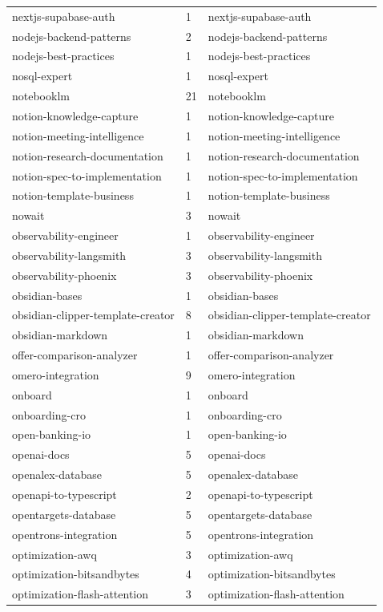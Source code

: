 \begin{longtable}{@{}lll@{}}
nextjs-supabase-auth & 1 & nextjs-supabase-auth\\
nodejs-backend-patterns & 2 & nodejs-backend-patterns\\
nodejs-best-practices & 1 & nodejs-best-practices\\
nosql-expert & 1 & nosql-expert\\
notebooklm & 21 & notebooklm\\
notion-knowledge-capture & 1 & notion-knowledge-capture\\
notion-meeting-intelligence & 1 & notion-meeting-intelligence\\
notion-research-documentation & 1 & notion-research-documentation\\
notion-spec-to-implementation & 1 & notion-spec-to-implementation\\
notion-template-business & 1 & notion-template-business\\
nowait & 3 & nowait\\
observability-engineer & 1 & observability-engineer\\
observability-langsmith & 3 & observability-langsmith\\
observability-phoenix & 3 & observability-phoenix\\
obsidian-bases & 1 & obsidian-bases\\
obsidian-clipper-template-creator & 8 & obsidian-clipper-template-creator\\
obsidian-markdown & 1 & obsidian-markdown\\
offer-comparison-analyzer & 1 & offer-comparison-analyzer\\
omero-integration & 9 & omero-integration\\
onboard & 1 & onboard\\
onboarding-cro & 1 & onboarding-cro\\
open-banking-io & 1 & open-banking-io\\
openai-docs & 5 & openai-docs\\
openalex-database & 5 & openalex-database\\
openapi-to-typescript & 2 & openapi-to-typescript\\
opentargets-database & 5 & opentargets-database\\
opentrons-integration & 5 & opentrons-integration\\
optimization-awq & 3 & optimization-awq\\
optimization-bitsandbytes & 4 & optimization-bitsandbytes\\
optimization-flash-attention & 3 & optimization-flash-attention\\

\end{longtable}
